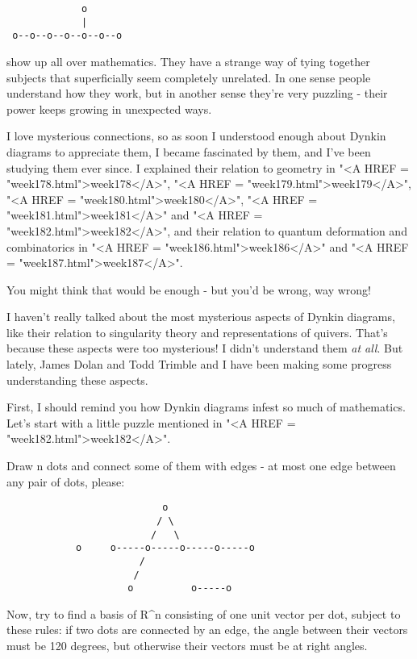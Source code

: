 \begin{verbatim}
             o
             |
 o--o--o--o--o--o--o
\end{verbatim}
    
show up all over mathematics.  They have a strange way of tying 
together subjects that superficially seem completely unrelated.
In one sense people understand how they work, but in another sense
they're very puzzling - their power keeps growing in unexpected ways.  

I love mysterious connections, so as soon I understood enough about
Dynkin diagrams to appreciate them, I became fascinated by them, 
and I've been studying them ever since.  I explained their relation
to geometry in "<A HREF = "week178.html">week178</A>", "<A HREF = "week179.html">week179</A>", "<A HREF = "week180.html">week180</A>", "<A HREF = "week181.html">week181</A>" and "<A HREF = "week182.html">week182</A>",
and their relation to quantum deformation and combinatorics in 
"<A HREF = "week186.html">week186</A>" and "<A HREF = "week187.html">week187</A>".  

You might think that would be enough - but you'd be wrong, way wrong!  

I haven't really talked about the most mysterious aspects of Dynkin 
diagrams, like their relation to singularity theory and representations
of quivers.  That's because these aspects were too mysterious!  
I didn't understand them \emph{at all}.  But lately, James Dolan and Todd 
Trimble and I have been making some progress understanding these aspects.  

First, I should remind you how Dynkin diagrams infest so much of
mathematics.  Let's start with a little puzzle mentioned in "<A HREF = "week182.html">week182</A>".

Draw n dots and connect some of them with edges - at most one edge 
between any pair of dots, please:

\begin{verbatim}
                           o
                          / \
                         /   \
            o     o-----o-----o-----o-----o
                       /
                      /
                     o          o-----o

\end{verbatim}
    
Now, try to find a basis of R^{n} 
consisting of one unit vector per dot, 
subject to these rules: if two dots are connected by an edge, the angle 
between their vectors must be 120 degrees, but otherwise their vectors 
must be at right angles. 

